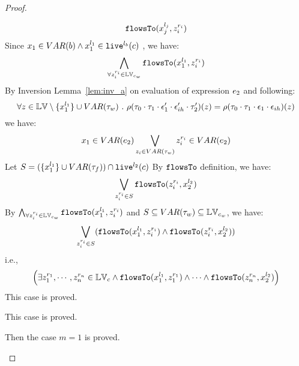 \begin{proof}
\begin{case}
\begin{subcase}
\begin{subsubcase}
\begin{subproof}
\begin{enumerate}
\[  \mathtt{flowsTo}(x_j^{l_j}, z_i^{r_i})
\]
Since $x_1 \in VAR(b) \land x_1^{l_1} \in \mathtt{live}^{l_b}(c)$ , we have:
\[
  \bigwedge_{\forall z_i^{r_i} \in \mathbb{LV}_{c_w}}
  \mathtt{flowsTo}(x_1^{l_1}, z_i^{r_i})
\]
%
By Inversion Lemma~\ref{lem:inv_a} on evaluation of expression $e_2$ and following: 
\[
  \forall z \in \mathbb{LV} \setminus \{x_1^{l_1}\} \cup VAR{(\mathtt{\tau}_w)} ~.~
  \rho(\mathtt{\tau}_0 \cdot \mathtt{\tau}_1 \cdot \mathtt{\epsilon}_1'\cdot \mathtt{\epsilon}_{ih}' \cdot \mathtt{\tau}_2')(z) 
  = \rho(\mathtt{\tau}_0 \cdot \mathtt{\tau}_1 \cdot \mathtt{\epsilon}_1\cdot \mathtt{\epsilon}_{ih})(z)
\]
%
we have:
\[
  x_1 \in VAR(e_2) \bigvee_{z_i \in VAR{(\mathtt{\tau}_w)}} z_i^{r_i} \in VAR(e_2)
\]
%
Let $S = (\{x_1^{l_1}\} \cup VAR{(\mathtt{\tau}_f)}) \cap \mathtt{live}^{l_2}(c) $
%
By $\mathtt{flowsTo}$ definition, we have:
\[
   \bigvee_{z_i^{r_i} \in S}  \mathtt{flowsTo}(z_i^{r_i}, x_2^{l_2})
\]
By $ \bigwedge_{\forall z_i^{r_i} \in \mathbb{LV}_{c_w}} \mathtt{flowsTo}(x_1^{l_1}, z_i^{r_i})$ and $S \subseteq VAR{(\mathtt{\tau}_w)} \subseteq \mathbb{LV}_{c_w}$, we have:
\[
\bigvee_{z_i^{r_i} \in S} 
(\mathtt{flowsTo}(x_1^{l_1}, z_i^{r_i}) \land \mathtt{flowsTo}(z_i^{r_i}, x_2^{l_2}))
\]
%
i.e.,
\[
\Big(\exists z_1^{r_1}, \cdots, z_n^{r_n} \in \mathbb{LV}_{{c}}
 \land \mathtt{flowsTo}(x_1^{l_1}, z_1^{r_1}) \land \cdots \land \mathtt{flowsTo}(z_n^{r_n}, {x}_2^{l_2}) \Big)
\]
%
This case is proved.
\end{enumerate}
\end{subproof}
%
This case is proved.
\end{subsubcase}
%
Then the case $m = 1$ is proved.
\end{subcase}
\end{case}
%

\end{proof}
